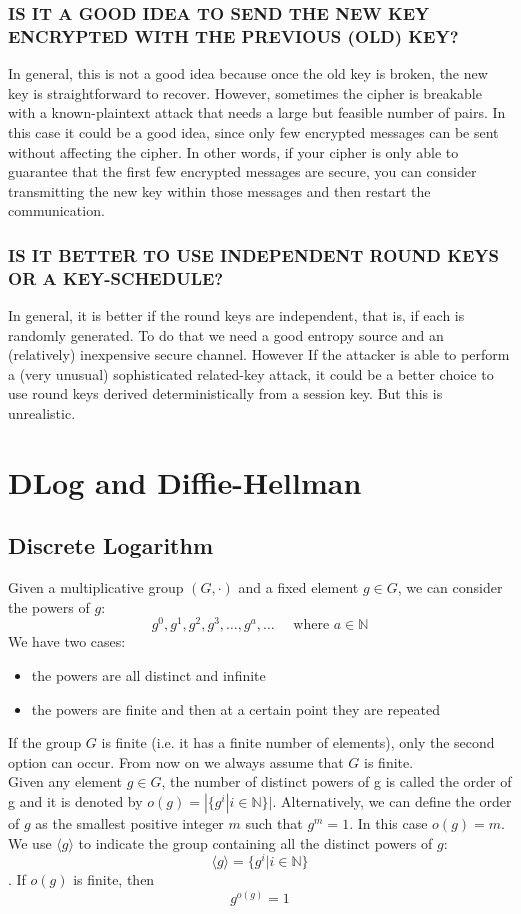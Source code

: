\documentclass[a4paper, 10pt, titlepage]{article}
\begin{document}
\subsubsection*{IS IT A GOOD IDEA TO SEND THE NEW KEY ENCRYPTED WITH THE PREVIOUS (OLD) KEY?}
In general, this is not a good idea because once the old key is broken, the new key is straightforward to recover.
However, sometimes the cipher is breakable with a known-plaintext attack that needs a large but feasible number of pairs. In this case it could be a good idea, since only few encrypted messages can be sent without affecting the cipher. In other words, if your cipher is only able to guarantee that the first few encrypted messages are secure, you can consider transmitting the new key within those messages and then restart the communication.

\subsubsection*{IS IT BETTER TO USE INDEPENDENT ROUND KEYS OR A KEY-SCHEDULE?}
In general, it is better if the round keys are independent, that is, if each is randomly generated. To do that we need a good entropy source and an (relatively) inexpensive secure channel.
However If the attacker is able to perform a (very unusual) sophisticated related-key attack, it could be a better choice to use round keys derived deterministically from a session key. But this is unrealistic.

\newpage
\section{DLog and Diffie-Hellman}
\subsection{Discrete Logarithm}
Given a multiplicative group $(G , \cdot)$ and a fixed element $g \in G$, we can consider the powers of $g$:
$$g^0, g^1, g^2, g^3, \dots , g^a, \dots \quad \text{ where } a \in \mathbb{N}$$
We have two cases:
\begin{itemize}
\item the powers are all distinct and infinite
\item the powers are finite and then at a certain point they are repeated
\end{itemize}
If the group $G$ is finite (i.e. it has a finite number of elements), only the second option can occur. From now on we always assume that $G$ is finite. \\
Given any element $g \in G$, the number of distinct powers of g is called the order of g and it is denoted by $o(g) = |\{g^i | i \in \mathbb{N}\}|$.
Alternatively, we can define the order of $g$ as the smallest positive integer $m$ such that $g^m = 1$. In this case $o(g) = m$.
We use $\langle g \rangle$ to indicate the group containing all the distinct powers of $g$:
$$\langle g \rangle = \{g^i | i \in \mathbb{N}\}$$.
If $o(g)$ is finite, then 
$$g^{o(g)} = 1$$
\end{document}
